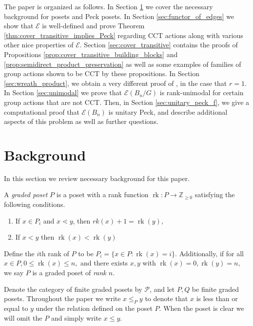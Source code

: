 \documentclass[10 pt]{amsart}
\theoremstyle{plain}
\theoremstyle{definition}
\theoremstyle{remark}
\numberwithin{equation}{section}
\newcommand\rk{\operatorname{rk}}
\begin{document}
The paper is organized as follows. In Section \ref{sec:background} we cover the necessary background for posets and Peck posets.  In Section \ref{sec:functor_of_edges} we show that $\mathcal E$ is well-defined and prove Theorem \ref{thm:cover_transitive_implies_Peck} regarding CCT actions along with various other nice properties of $\mathcal E$. Section \ref{sec:cover_transitive} contains the proofs of Propositions \ref{prop:cover_transitive_building_blocks} and \ref{prop:semidirect_product_preservation} as well as some examples of families of group actions shown to be CCT by these propositions. In Section \ref{sec:wreath_product}, we obtain a very different proof of \cite[Theorem 1.1]{pak}, in the case that $r = 1$. In Section \ref{sec:unimodal} we prove that $\mathcal E(B_n/G)$ is rank-unimodal for certain group actions that are not CCT. Then, in Section \ref{sec:unitary_peck_f}, we give a computational proof that $\mathcal E(B_n)$ is unitary Peck, and describe additional aspects of this problem as well as further questions.



\section{Background}\label{sec:background}
In this section we review necessary background for this paper. 

A {\it graded poset} $P$ is a poset with a rank function $\rk:P \rightarrow \mathbb Z_{\geq 0}$ satisfying the following conditions.
\begin{enumerate}
  \item If $x\in P_i$ and $x\lessdot y$, then $rk(x) + 1 = \rk(y),$
  \item If $x < y$ then $\rk(x) < \rk(y)$ 
\end{enumerate}

Define the $i$th rank of $P$ to be  $P_i = \{x \in P\colon\rk(x) = i\}.$ Additionally, if for all $x\in P,0 \leq \rk(x) \leq n,$ and there exists $x,y$ with $\rk(x) = 0, \rk(y) = n,$ we say $P$ is a graded poset of {\it rank $n$}.

Denote the category of finite graded posets by $\mathcal{P}$, and let $P,Q$ be finite graded posets.  Throughout the paper we write $x\le_P y$ to denote that $x$ is less than or equal to $y$ under the relation defined on the poset $P$.  When the poset is clear we will omit the $P$ and simply write $x\le y$.  
\end{document}
